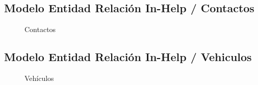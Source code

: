 \subsection{Modelo Entidad Relación In-Help / Contactos}
\begin{figure}[htbp!]
	\centering
	\caption{Contactos}
	\label{fig:BD_Contactos}
\end{figure}
\subsection{Modelo Entidad Relación In-Help / Vehiculos}
\begin{figure}[htbp!]
	\centering
	\caption{Vehículos}
	\label{fig:BD_Vehiculo}
\end{figure}
